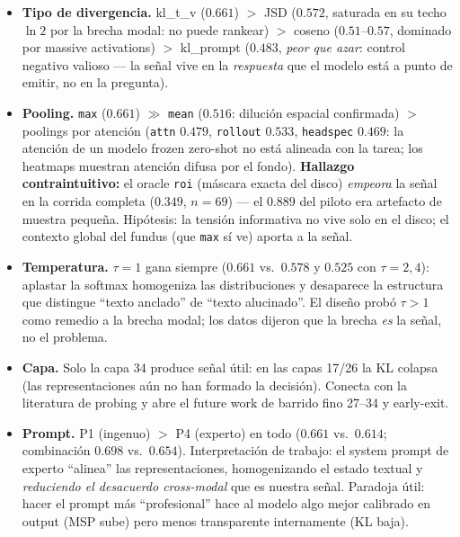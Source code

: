 \documentclass[12pt,a4paper]{article}
\begin{document}
\begin{itemize}[leftmargin=1.4em]
    \item \textbf{Tipo de divergencia.} kl\_t\_v ($0.661$) $>$ JSD
    ($0.572$, saturada en su techo $\ln 2$ por la brecha modal: no puede
    rankear) $>$ coseno ($0.51$--$0.57$, dominado por massive activations)
    $>$ kl\_prompt ($0.483$, \emph{peor que azar}: control negativo
    valioso --- la señal vive en la \emph{respuesta} que el modelo está a
    punto de emitir, no en la pregunta).
    \item \textbf{Pooling.} \texttt{max} ($0.661$) $\gg$ \texttt{mean}
    ($0.516$: dilución espacial confirmada) $>$ poolings por atención
    (\texttt{attn} $0.479$, \texttt{rollout} $0.533$, \texttt{headspec}
    $0.469$: la atención de un modelo frozen zero-shot no está alineada
    con la tarea; los heatmaps muestran atención difusa por el fondo).
    \textbf{Hallazgo contraintuitivo:} el oracle \texttt{roi} (máscara
    exacta del disco) \emph{empeora} la señal en la corrida completa
    ($0.349$, $n = 69$) --- el $0.889$ del piloto era artefacto de muestra
    pequeña. Hipótesis: la tensión informativa no vive solo en el disco;
    el contexto global del fundus (que \texttt{max} sí ve) aporta a la
    señal.
    \item \textbf{Temperatura.} $\tau = 1$ gana siempre ($0.661$ vs.\
    $0.578$ y $0.525$ con $\tau = 2, 4$): aplastar la softmax homogeniza
    las distribuciones y desaparece la estructura que distingue ``texto
    anclado'' de ``texto alucinado''. El diseño probó $\tau > 1$ como
    remedio a la brecha modal; los datos dijeron que la brecha \emph{es}
    la señal, no el problema.
    \item \textbf{Capa.} Solo la capa 34 produce señal útil: en las capas
    17/26 la KL colapsa (las representaciones aún no han formado la
    decisión). Conecta con la literatura de probing y abre el future work
    de barrido fino 27--34 y early-exit.
    \item \textbf{Prompt.} P1 (ingenuo) $>$ P4 (experto) en todo
    ($0.661$ vs.\ $0.614$; combinación $0.698$ vs.\ $0.654$).
    Interpretación de trabajo: el system prompt de experto ``alinea'' las
    representaciones, homogenizando el estado textual y \emph{reduciendo
    el desacuerdo cross-modal} que es nuestra señal. Paradoja útil: hacer
    el prompt más ``profesional'' hace al modelo algo mejor calibrado en
    output (MSP sube) pero menos transparente internamente (KL baja).
\end{itemize}
\end{document}
